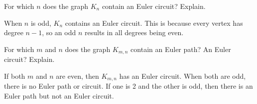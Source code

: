 \begin{questions}
	\begin{answer}
	\end{answer}
	
	
	


\question For which $n$ does the graph $K_n$ contain an Euler circuit?  Explain.

	\begin{answer}
		When $n$ is odd, $K_n$ contains an Euler circuit.  This is because every vertex has degree $n-1$, so an odd $n$ results in all degrees being even.%
	\end{answer}
	
	
	


\question For which $m$ and $n$ does the graph $K_{m,n}$ contain an Euler path?  An Euler circuit?  Explain.

	\begin{answer}
		If both $m$ and $n$ are even, then $K_{m,n}$ has an Euler circuit.  When both are odd, there is no Euler path or circuit.  If one is 2 and the other is odd, then there is an Euler path but not an Euler circuit. %
	\end{answer}
	

\end{questions}
